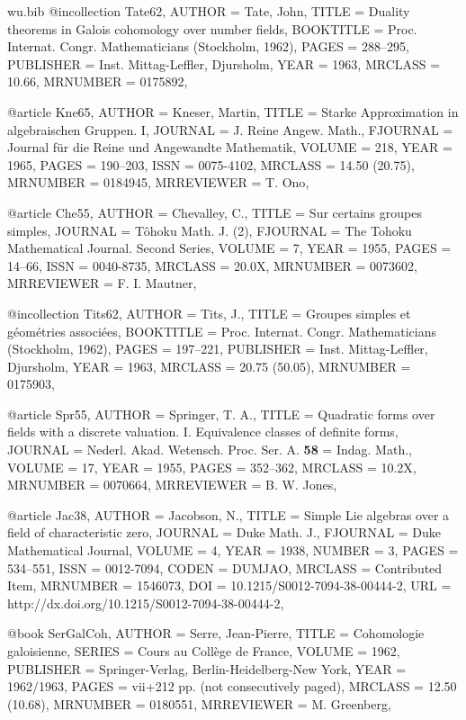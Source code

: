 \documentclass{amsart}
\numberwithin{equation}{section}
\theoremstyle{plain}
\theoremstyle{definition}
\begin{document}
\begin{filecontents}{wu.bib}
	@incollection {Tate62,
		AUTHOR = {Tate, John},
		TITLE = {Duality theorems in {G}alois cohomology over number fields},
		BOOKTITLE = {Proc. {I}nternat. {C}ongr. {M}athematicians ({S}tockholm,
			1962)},
		PAGES = {288--295},
		PUBLISHER = {Inst. Mittag-Leffler, Djursholm},
		YEAR = {1963},
		MRCLASS = {10.66},
		MRNUMBER = {0175892},
	}
	
	@article {Kne65,
		AUTHOR = {Kneser, Martin},
		TITLE = {Starke {A}pproximation in algebraischen {G}ruppen. {I}},
		JOURNAL = {J. Reine Angew. Math.},
		FJOURNAL = {Journal f\"ur die Reine und Angewandte Mathematik},
		VOLUME = {218},
		YEAR = {1965},
		PAGES = {190--203},
		ISSN = {0075-4102},
		MRCLASS = {14.50 (20.75)},
		MRNUMBER = {0184945},
		MRREVIEWER = {T. Ono},
	}
	
	@article {Che55,
		AUTHOR = {Chevalley, C.},
		TITLE = {Sur certains groupes simples},
		JOURNAL = {T\^ohoku Math. J. (2)},
		FJOURNAL = {The Tohoku Mathematical Journal. Second Series},
		VOLUME = {7},
		YEAR = {1955},
		PAGES = {14--66},
		ISSN = {0040-8735},
		MRCLASS = {20.0X},
		MRNUMBER = {0073602},
		MRREVIEWER = {F. I. Mautner},
	}
	
	@incollection {Tits62,
		AUTHOR = {Tits, J.},
		TITLE = {Groupes simples et g\'eom\'etries associ\'ees},
		BOOKTITLE = {Proc. {I}nternat. {C}ongr. {M}athematicians ({S}tockholm,
			1962)},
		PAGES = {197--221},
		PUBLISHER = {Inst. Mittag-Leffler, Djursholm},
		YEAR = {1963},
		MRCLASS = {20.75 (50.05)},
		MRNUMBER = {0175903},
	}
	
	@article {Spr55,
		AUTHOR = {Springer, T. A.},
		TITLE = {Quadratic forms over fields with a discrete valuation. {I}.
			{E}quivalence classes of definite forms},
		JOURNAL = {Nederl. Akad. Wetensch. Proc. Ser. A. {\bf 58} = Indag. Math.},
		VOLUME = {17},
		YEAR = {1955},
		PAGES = {352--362},
		MRCLASS = {10.2X},
		MRNUMBER = {0070664},
		MRREVIEWER = {B. W. Jones},
	}
	
	@article {Jac38,
		AUTHOR = {Jacobson, N.},
		TITLE = {Simple {L}ie algebras over a field of characteristic zero},
		JOURNAL = {Duke Math. J.},
		FJOURNAL = {Duke Mathematical Journal},
		VOLUME = {4},
		YEAR = {1938},
		NUMBER = {3},
		PAGES = {534--551},
		ISSN = {0012-7094},
		CODEN = {DUMJAO},
		MRCLASS = {Contributed Item},
		MRNUMBER = {1546073},
		DOI = {10.1215/S0012-7094-38-00444-2},
		URL = {http://dx.doi.org/10.1215/S0012-7094-38-00444-2},
	}
	
	@book {SerGalCoh,
		AUTHOR = {Serre, Jean-Pierre},
		TITLE = {Cohomologie galoisienne},
		SERIES = {Cours au Coll\`ege de France},
		VOLUME = {1962},
		PUBLISHER = {Springer-Verlag, Berlin-Heidelberg-New York},
		YEAR = {1962/1963},
		PAGES = {vii+212 pp. (not consecutively paged)},
		MRCLASS = {12.50 (10.68)},
		MRNUMBER = {0180551},
		MRREVIEWER = {M. Greenberg},
	}
	

\end{filecontents}
\end{document}
